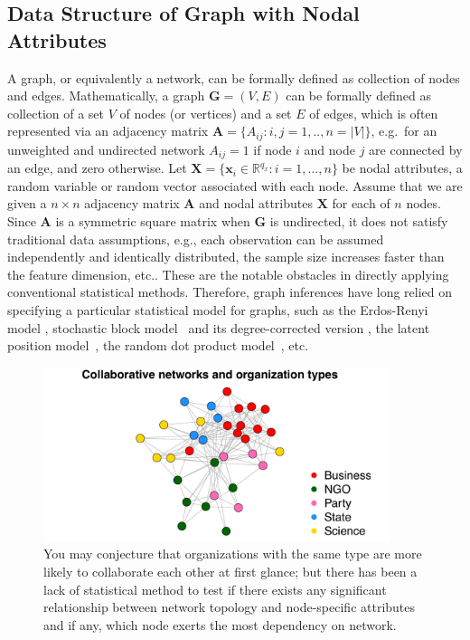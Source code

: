 \documentclass[11pt]{article}
\theoremstyle{definition}
\begin{document}
\subsection{Data Structure of Graph with Nodal Attributes}
A graph, or equivalently a network, can be formally defined as collection of nodes and edges.
Mathematically, a graph $\mathbf{G}=(V,E)$ can be formally defined as collection of a set $V$ of nodes (or vertices) and a set $E$ of edges, which is often represented via an adjacency matrix $\mathbf{A} = \{A_{ij} : i,j= 1,..,n = |V| \}$, e.g.~for an unweighted and undirected network $A_{ij} = 1$ if node $i$ and node $j$ are connected by an edge, and zero otherwise. Let $\mathbf{X} = \{  \mathbf{x}_{i} \in \mathbb{R}^{q_{x}} : i = 1, \ldots, n \}$ be nodal attributes, a random variable or random vector associated with each node. Assume that we are given a $n \times n$ adjacency matrix $\mathbf{A}$ and nodal attributes $\mathbf{X}$ for each of $n$ nodes. Since $\mathbf{A}$ is a symmetric square matrix when $\mathbf{G}$ is undirected, it does not satisfy traditional data assumptions, e.g., each observation can be assumed independently and identically distributed, the sample size increases faster than the feature dimension, etc.. These are the notable obstacles in directly applying conventional statistical methods. Therefore, graph inferences have long relied on specifying a particular statistical model for graphs, such as the Erdos-Renyi model \cite{erdosrenyi1959,Gilbert1959}, stochastic block model~\cite{HollandEtAl1983, rohe2011spectral,SussmanEtAl2012,Lei2015} and its degree-corrected version \cite{karrer2011stochastic, ZhaoLevinaZhu2012}, the latent position model~\cite{TangSussmanPriebe2013,fosdick2015testing}, the random dot product model~\cite{YoungScheinerman2007, sussman2014consistent}, etc. 
\begin{figure}[ht]
	\centering
	\includegraphics[width=4in]{introplot.pdf}	
	\caption{You may conjecture that organizations with the same type are more likely to collaborate each other at first glance; but there has been a lack of statistical method to test if there exists any significant relationship between network topology and node-specific attributes and if any, which node exerts the most dependency on network.}
	\label{fig:intro}
\end{figure}
\end{document}
